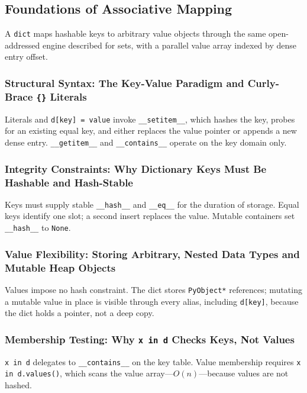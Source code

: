 \subsection{Foundations of Associative Mapping}

A \texttt{dict} maps hashable keys to arbitrary value objects through the same open-addressed engine described for sets, with a parallel value array indexed by dense entry offset.

\subsubsection{Structural Syntax: The Key-Value Paradigm and Curly-Brace \texttt{\{\}} Literals}

Literals and \texttt{d[key] = value} invoke \texttt{\_\_setitem\_\_}, which hashes the key, probes for an existing equal key, and either replaces the value pointer or appends a new dense entry. \texttt{\_\_getitem\_\_} and \texttt{\_\_contains\_\_} operate on the key domain only.

\subsubsection{Integrity Constraints: Why Dictionary Keys Must Be Hashable and Hash-Stable}

Keys must supply stable \texttt{\_\_hash\_\_} and \texttt{\_\_eq\_\_} for the duration of storage. Equal keys identify one slot; a second insert replaces the value. Mutable containers set \texttt{\_\_hash\_\_} to \texttt{None}.

\subsubsection{Value Flexibility: Storing Arbitrary, Nested Data Types and Mutable Heap Objects}

Values impose no hash constraint. The dict stores \texttt{PyObject*} references; mutating a mutable value in place is visible through every alias, including \texttt{d[key]}, because the dict holds a pointer, not a deep copy.

\subsubsection{Membership Testing: Why \texttt{x in d} Checks Keys, Not Values}

\texttt{x in d} delegates to \texttt{\_\_contains\_\_} on the key table. Value membership requires \texttt{x in d.values()}, which scans the value array---$O(n)$---because values are not hashed.
